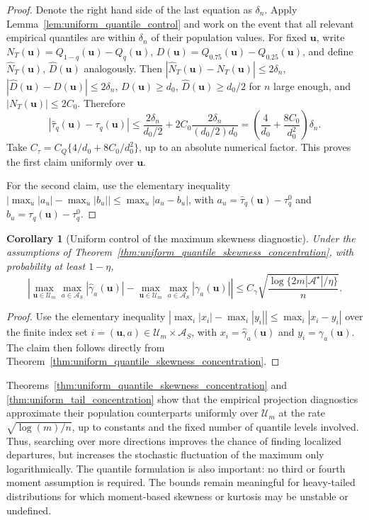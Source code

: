 \documentclass[11pt]{article}
\theoremstyle{plain}
\newtheorem{corollary}{Corollary}
\theoremstyle{definition}
\theoremstyle{remark}
\def\u{\bm{u}}
\newcommand{\abs}[1]{\left\lvert #1 \right\rvert}
\begin{document}
\begin{proof}
	Denote the right hand side of the last equation as $\delta_n$. Apply Lemma~\ref{lem:uniform_quantile_control} and work on the event that all relevant empirical quantiles are within \(\delta_n\) of their population values. For fixed $\u$, write \(N_T(\u)=Q_{1-q}(\u)-Q_q(\u)\), \(D(\u)=Q_{0.75}(\u)-Q_{0.25}(\u)\), and define \(\widehat N_T(\u)\), \(\widehat D(\u)\) analogously. Then \(|\widehat N_T(\u)-N_T(\u)|\leqslant 2\delta_n\), \(|\widehat D(\u)-D(\u)| \leqslant 2\delta_n\), \(D(\u)\geqslant d_0\), \(\widehat D(\u)\geqslant d_0/2\) for \(n\) large enough, and \(|N_T(\u)|\leqslant 2C_0\). Therefore
	\[
	\abs{\widehat\tau_q(\u)-\tau_q(\u)} \leqslant \frac{2\delta_n}{d_0/2} + 2C_0\frac{2\delta_n}{(d_0/2)d_0} = \left(\frac{4}{d_0}+\frac{8C_0}{d_0^2}\right)\delta_n .
	\]
	Take \(C_\tau=C_Q\{4/d_0+8C_0/d_0^2\}\), up to an absolute numerical factor.	This proves the first claim uniformly over $\u$.
	
	For the second claim, use the elementary inequality
	\(\abs{\max_u|a_u|-\max_u|b_u|} \leqslant \max_u|a_u-b_u|\), with \(a_u=\widehat\tau_q(\u)-\tau_q^0\) and \(b_u=\tau_q(\u)-\tau_q^0\). 
\end{proof}

\begin{corollary}[Uniform control of the maximum skewness diagnostic]
	\label{cor:max_skewness_concentration}
	Under the assumptions of Theorem~\ref{thm:uniform_quantile_skewness_concentration}, with probability at least \(1-\eta\),
	\[
	\abs{\max_{\u\in\mathcal U_m}\max_{a\in\mathcal A_S} \abs{\widehat\gamma_{a}(\u)} - \max_{\u\in\mathcal U_m}\max_{a\in\mathcal A_S}\abs{\gamma_{a}(\u)}} \leqslant C_\gamma \sqrt{\frac{\log\{2m|\mathcal A^\star|/\eta\}}{n}}.
	\]
\end{corollary}

\begin{proof}
	Use the elementary inequality
	\(
	\left|\max_i |x_i|-\max_i |y_i|\right|
	\leqslant
	\max_i |x_i-y_i|
	\)
	over the finite index set \(i=(\u,a)\in\mathcal U_m\times\mathcal A_S\), with \(x_i=\widehat\gamma_{a}(\u)\) and \(y_i=\gamma_{a}(\u)\). The claim then follows directly from Theorem~\ref{thm:uniform_quantile_skewness_concentration}.
\end{proof}

Theorems~\ref{thm:uniform_quantile_skewness_concentration} and \ref{thm:uniform_tail_concentration} show that the empirical projection diagnostics approximate their population counterparts uniformly over \(\mathcal U_m\) at the rate \(\sqrt{\log(m)/n}\), up to constants and the fixed number of quantile levels involved. Thus, searching over more directions improves the chance of finding localized departures, but increases the stochastic fluctuation of the maximum only logarithmically. The quantile formulation is also important: no third or fourth moment assumption is required. The bounds remain meaningful for heavy-tailed distributions for which moment-based skewness or kurtosis may be unstable or undefined.
\end{document}
